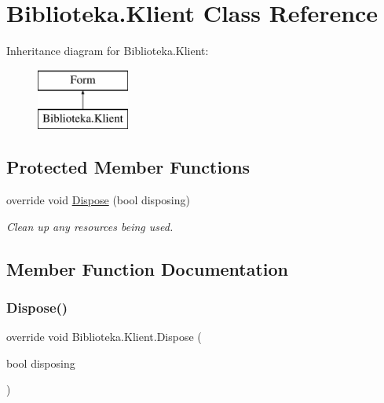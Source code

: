 \hypertarget{class_biblioteka_1_1_klient}{}\section{Biblioteka.\+Klient Class Reference}
\label{class_biblioteka_1_1_klient}
Inheritance diagram for Biblioteka.\+Klient\+:\begin{figure}[H]
\begin{center}
\leavevmode
\includegraphics[height=2.000000cm]{class_biblioteka_1_1_klient}
\end{center}
\end{figure}
\subsection*{Protected Member Functions}
\begin{DoxyCompactItemize}
\item 
override void \hyperlink{class_biblioteka_1_1_klient_abc5ba28c26800c700600a2a19a1305f4}{Dispose} (bool disposing)
\begin{DoxyCompactList}\small\item\em Clean up any resources being used. \end{DoxyCompactList}\end{DoxyCompactItemize}


\subsection{Member Function Documentation}
\mbox{\label{class_biblioteka_1_1_klient_abc5ba28c26800c700600a2a19a1305f4}} 
\subsubsection{\texorpdfstring{Dispose()}{Dispose()}}
{\footnotesize\ttfamily override void Biblioteka.\+Klient.\+Dispose (\begin{DoxyParamCaption}\item[{bool}]{disposing }\end{DoxyParamCaption})\hspace{0.3cm}{\ttfamily [protected]}}



